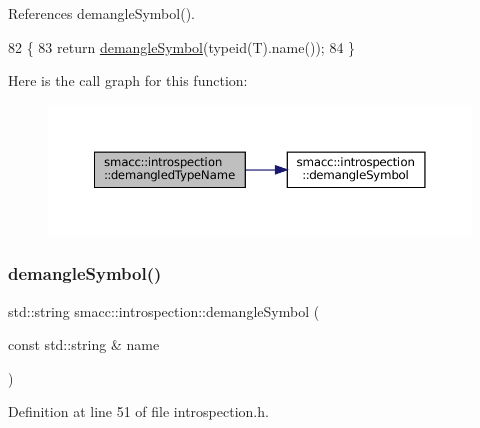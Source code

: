 References demangle\+Symbol().


\begin{DoxyCode}
82 \{
83     \textcolor{keywordflow}{return} \hyperlink{namespacesmacc_1_1introspection_aa9158a0ff0cfe83a59877e6af7d7f873}{demangleSymbol}(\textcolor{keyword}{typeid}(T).name());
84 \}
\end{DoxyCode}
Here is the call graph for this function\+:
\nopagebreak
\begin{figure}[H]
\begin{center}
\leavevmode
\includegraphics[width=350pt]{namespacesmacc_1_1introspection_af1b3277706c3299b589c3fa801169286_cgraph}
\end{center}
\end{figure}
\mbox{\label{namespacesmacc_1_1introspection_a2f495108db3e57604d8d3ff5ef030302}} 
\subsubsection{\texorpdfstring{demangle\+Symbol()}{demangleSymbol()}\hspace{0.1cm}{\footnotesize\ttfamily [1/3]}}
{\footnotesize\ttfamily std\+::string smacc\+::introspection\+::demangle\+Symbol (\begin{DoxyParamCaption}\item[{const std\+::string \&}]{name }\end{DoxyParamCaption})\hspace{0.3cm}{\ttfamily [inline]}}



Definition at line 51 of file introspection.\+h.



